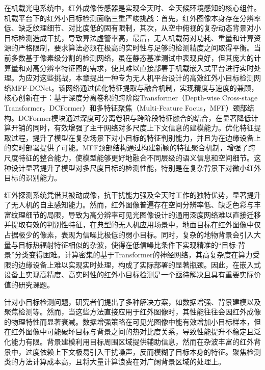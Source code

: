 


在机载光电系统中，红外成像传感器是实现全天时、全天候环境感知的核心组件。机载平台下的红外小目标检测面临三重严峻挑战：首先，红外图像本身存在分辨率低、缺乏纹理细节、对比度低的固有限制，其次，从空中俯视的复杂动态背景对小目标检测造成干扰，导致算法虚警率高，最后，无人机载荷对功耗、重量和计算资源的严格限制，要求算法必须在极高的实时性与足够的检测精度之间取得平衡。当前多数基于像素级分割的检测网络，虽在静态基准测试中表现良好，但其庞大的计算量和对高分辨率特征图的需求，使其难以直接部署于机载嵌入式平台进行实时处理。为应对这些挑战，本章提出一种专为无人机平台设计的高效红外小目标检测网络MFF-DCNet。该网络通过优化特征提取与融合机制，实现精度与速度的兼顾，核心创新在于：基于深度分离卷积的跨阶段Transformer（Depth-wise Cross-stage Transformer，DCFormer）和多特征聚焦（Multi-Feature Focus，MFF）颈部结构。DCFormer模块通过深度可分离卷积与跨阶段特征融合的结合，在显著降低计算开销的同时，有效增强了主干网络对多尺度上下文信息的建模能力。优化特征提取过程，提升了模型在复杂场景下对小目标的特征判别能力，并且为在边缘设备上的实时部署提供了可能。MFF颈部结构通过构建新颖的特征聚合机制，增强了跨尺度特征的整合能力，使模型能够更好地融合不同层级的语义信息和空间细节。这种设计显著提升了模型对多尺度目标的检测性能，特别是在复杂背景下对微小红外目标的识别能力。

红外探测系统凭借其被动成像，抗干扰能力强及全天时工作的独特优势，显著提升了无人机的自主感知能力。然而，红外图像普遍存在空间分辨率低、缺乏色彩与丰富纹理细节的局限\cite{Zhao2022survey}，导致为高分辨率可见光图像设计的通用深度网络难以直接迁移并提取有效的判别性特征，在典型的无人机应用场景中，地面目标在红外图像中仅占据极少的像素，表现为信噪比极低的弱小目标。同时，复杂的地物背景会引入大量与目标热辐射特征相似的杂波，使得在低信噪比条件下实现精准的“目标-背景”分类变得困难。计算密集的基于Transformer的神经网络，其高复杂度在算力受限的边缘设备上难以实现实时处理，构成了实际部署的显著瓶颈。因此，在嵌入式设备上实现高精度、高实时性的红外小目标检测是一个亟待解决且具有重要实际价值的研究课题。

针对小目标检测问题，研究者们提出了多种解决方案，如数据增强、背景建模\cite{Tong2022survey,Kou2023survey}以及聚焦检测等\cite{Yang2019ClusteredOD}。然而，当这些方法直接应用于红外图像时，其性能往往会因红外成像的物理特性而显著衰减。数据增强策略在可见光图像中能有效增加小目标样本，但在红外图像中可能破坏目标与背景之间的热对比度关系，导致性能提升不稳定且泛化能力有限。背景建模利用目标周围区域提供辅助信息，然而在杂波丰富的红外背景中，过度依赖上下文极易引入干扰噪声，反而模糊了目标本身的特征。聚焦检测类的方法计算成本高，且将大量计算浪费在对广阔背景区域的处理上。

